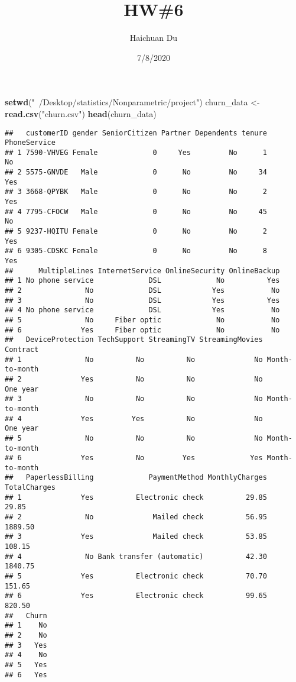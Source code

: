 \documentclass[]{article}
\title{HW\#6}
\author{Haichuan Du}
\date{7/8/2020}
\newenvironment{Shaded}{\begin{snugshade}}{\end{snugshade}}
\newcommand{\KeywordTok}[1]{\textcolor[rgb]{0.13,0.29,0.53}{\textbf{#1}}}
\newcommand{\NormalTok}[1]{#1}
\newcommand{\StringTok}[1]{\textcolor[rgb]{0.31,0.60,0.02}{#1}}
\begin{document}
\maketitle

\begin{Shaded}
\begin{Highlighting}[]
\KeywordTok{setwd}\NormalTok{(}\StringTok{"~/Desktop/statistics/Nonparametric/project"}\NormalTok{)}
\NormalTok{churn_data <-}\StringTok{ }\KeywordTok{read.csv}\NormalTok{(}\StringTok{"churn.csv"}\NormalTok{)}
\KeywordTok{head}\NormalTok{(churn_data)}
\end{Highlighting}
\end{Shaded}

\begin{verbatim}
##   customerID gender SeniorCitizen Partner Dependents tenure PhoneService
## 1 7590-VHVEG Female             0     Yes         No      1           No
## 2 5575-GNVDE   Male             0      No         No     34          Yes
## 3 3668-QPYBK   Male             0      No         No      2          Yes
## 4 7795-CFOCW   Male             0      No         No     45           No
## 5 9237-HQITU Female             0      No         No      2          Yes
## 6 9305-CDSKC Female             0      No         No      8          Yes
##      MultipleLines InternetService OnlineSecurity OnlineBackup
## 1 No phone service             DSL             No          Yes
## 2               No             DSL            Yes           No
## 3               No             DSL            Yes          Yes
## 4 No phone service             DSL            Yes           No
## 5               No     Fiber optic             No           No
## 6              Yes     Fiber optic             No           No
##   DeviceProtection TechSupport StreamingTV StreamingMovies       Contract
## 1               No          No          No              No Month-to-month
## 2              Yes          No          No              No       One year
## 3               No          No          No              No Month-to-month
## 4              Yes         Yes          No              No       One year
## 5               No          No          No              No Month-to-month
## 6              Yes          No         Yes             Yes Month-to-month
##   PaperlessBilling             PaymentMethod MonthlyCharges TotalCharges
## 1              Yes          Electronic check          29.85        29.85
## 2               No              Mailed check          56.95      1889.50
## 3              Yes              Mailed check          53.85       108.15
## 4               No Bank transfer (automatic)          42.30      1840.75
## 5              Yes          Electronic check          70.70       151.65
## 6              Yes          Electronic check          99.65       820.50
##   Churn
## 1    No
## 2    No
## 3   Yes
## 4    No
## 5   Yes
## 6   Yes
\end{verbatim}
\end{document}
